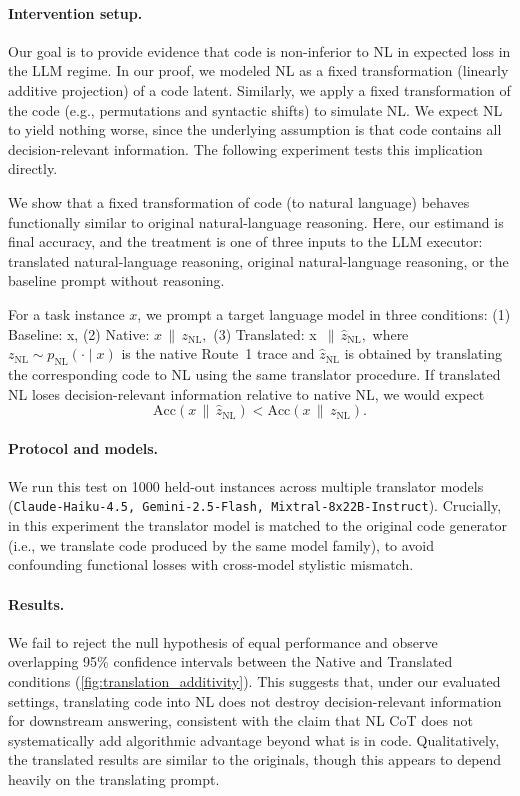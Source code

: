 \paragraph{Intervention setup.}
Our goal is to provide evidence that code is non-inferior to NL in expected loss in the LLM regime. In our proof, we modeled NL as a fixed transformation (linearly additive projection) of a code latent. Similarly, we apply a fixed transformation of the code (e.g., permutations and syntactic shifts) to simulate NL. We expect NL to yield nothing worse, since the underlying assumption is that code contains all decision-relevant information. The following experiment tests this implication directly.

We show that a fixed transformation of code (to natural language) behaves
functionally similar to original natural-language reasoning. Here, our estimand
is final accuracy, and the treatment is one of three inputs to the LLM executor:
translated natural-language reasoning, original natural-language reasoning, or
the baseline prompt without reasoning.

For a task instance $x$, we prompt a target language model in three conditions:
(1) Baseline:  x,
(2) Native: $ x \,\|\, z_{\mathrm{NL}},$
(3) Translated:  x $\,\|\, \hat z_{\mathrm{NL}},$ where $z_{\mathrm{NL}} \sim p_{\mathrm{NL}}(\cdot\mid x)$ is the native Route~1 trace and
$\hat z_{\mathrm{NL}}$ is obtained by translating the corresponding code to NL using the same translator procedure.
If translated NL loses decision-relevant information relative to native NL, we would expect
\[
\mathrm{Acc}(x \,\|\, \hat z_{\mathrm{NL}}) < \mathrm{Acc}(x \,\|\, z_{\mathrm{NL}}).
\]

\paragraph{Protocol and models.}
We run this test on 1000 held-out instances across multiple translator models (\texttt{Claude-Haiku-4.5, Gemini-2.5-Flash, Mixtral-8x22B-Instruct}).
Crucially, in this experiment the translator model is matched to the original code generator (i.e., we translate code produced by the same model family), to avoid confounding functional losses with cross-model stylistic mismatch.

\paragraph{Results.}
We fail to reject the null hypothesis of equal performance and observe overlapping 95\% confidence intervals between the Native and Translated conditions (\cref{fig:translation_additivity}).
This suggests that, under our evaluated settings, translating code into NL does not destroy decision-relevant information for downstream answering, consistent with the claim that NL CoT does not systematically add algorithmic advantage beyond what is in code. Qualitatively, the translated results are similar to the originals, though this appears to depend heavily on the translating prompt.


